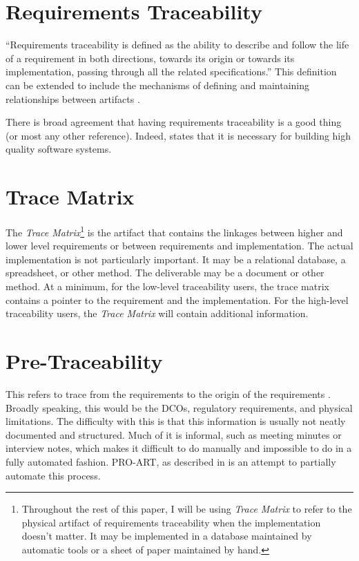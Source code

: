 \documentclass[10pt, openany]{report}
\newcommand{\trace}{\emph{Trace Matrix}}
\begin{document}
\section{Requirements Traceability}
``Requirements traceability is defined as the ability to describe and follow the life of a requirement in both directions, towards its origin or towards its implementation, passing through all the related specifications.''\cite{req7}  This definition can be extended to include the mechanisms of defining and maintaining relationships between artifacts \cite{req4}.

There is broad agreement that having requirements traceability is a good thing \cite{req6} (or most any other reference).  Indeed, \cite{req5} states that it is necessary for building high quality software systems.

\section{Trace Matrix}
The \trace{}\footnote{Throughout the rest of this paper, I will be using \trace{} to refer to the physical artifact of requirements traceability when the implementation doesn't matter.  It may be implemented in a database maintained by automatic tools or a sheet of paper maintained by hand.
} is the artifact that contains the linkages between higher and lower level requirements or between requirements and implementation.  The actual implementation is not particularly important.  It may be a relational database, a spreadsheet, or other method.  The deliverable may be a document or other method.  At a minimum, for the low-level traceability users, the trace matrix contains a pointer to the requirement and the implementation.  For the high-level traceability users, the \trace{} will contain additional information.

\section{Pre-Traceability}
This refers to trace from the requirements to the origin of the requirements \cite{req5}.  Broadly speaking, this would be the DCOs, regulatory requirements, and physical limitations.  The difficulty with this is that this information is usually not neatly documented and structured.  Much of it is informal, such as meeting minutes or interview notes, which makes it difficult to do manually and impossible to do in a fully automated fashion.  PRO-ART, as described in \cite{req5} is an attempt to partially automate this process.
\end{document}
